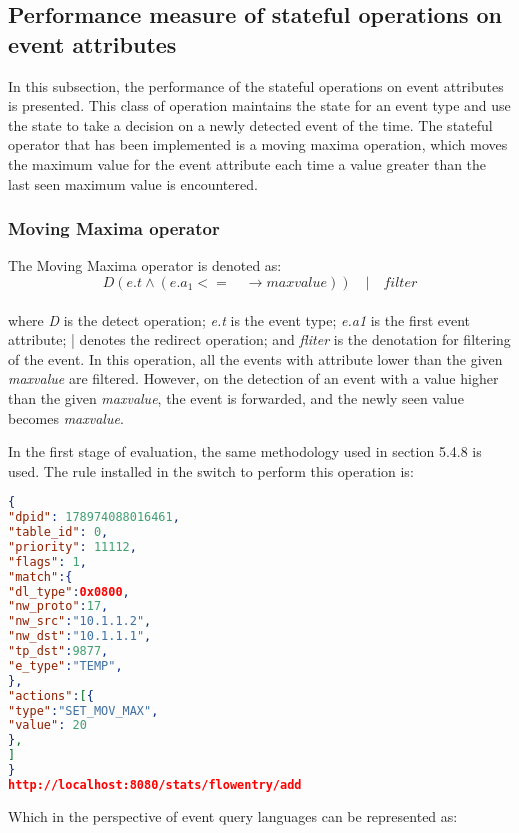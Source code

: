\subsection{Performance measure of stateful operations on event attributes}
In this subsection, the performance of the stateful operations on event attributes is presented. This class of operation maintains the state for an event type and use the state to take a decision on a newly detected event of the time. The stateful operator that has been implemented is a moving maxima operation, which moves the maximum value for the event attribute each time a value greater than the last seen maximum value is encountered.
\subsubsection{Moving Maxima operator}
The Moving Maxima operator is denoted as:
\begin{equation}
D(e.t  \wedge (e.a_1  <=\quad \rightarrow maxvalue) ) \quad | \quad filter
\end{equation}\\
where \textit{D} is the detect operation; \newline
\textit{e.t} is the event type; \newline
\textit{e.a1} is the first event attribute; \newline
| denotes the redirect operation; \newline
and \textit{fliter} is the denotation for filtering of the event. \newline \newline
In this operation, all the events with attribute lower than the given \textit{maxvalue} are filtered. However, on the detection of an event with a value higher than the given \textit{maxvalue}, the event is forwarded, and the newly seen value becomes \textit{maxvalue}. 

In the first stage of evaluation, the same methodology used in section 5.4.8 is used. The rule installed in the switch to perform this operation is:
\begin{lstlisting}[language=json,firstnumber=1]
{
"dpid": 178974088016461,
"table_id": 0,
"priority": 11112,
"flags": 1,
"match":{
"dl_type":0x0800,
"nw_proto":17,
"nw_src":"10.1.1.2",
"nw_dst":"10.1.1.1",
"tp_dst":9877,
"e_type":"TEMP",
},
"actions":[{
"type":"SET_MOV_MAX",
"value": 20
},
]
}
http://localhost:8080/stats/flowentry/add \end{lstlisting}

Which in the perspective of event query languages can be represented as:

